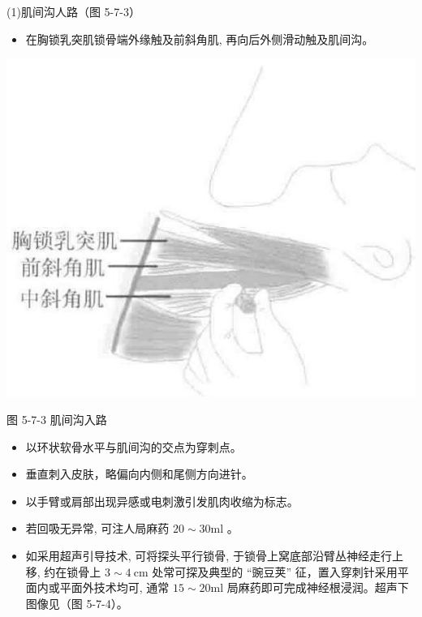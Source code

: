 \documentclass[10pt]{article}
\begin{document}
(1)肌间沟人路（图 5-7-3）

\begin{itemize}
  \item 在胸锁乳突肌锁骨端外缘触及前斜角肌, 再向后外侧滑动触及肌间沟。
\end{itemize}

\begin{center}
\includegraphics[max width=\textwidth]{2024_07_05_645bb794a4d4f32ee0c8g-318}
\end{center}

图 5-7-3 肌间沟入路

\begin{itemize}
  \item 以环状软骨水平与肌间沟的交点为穿刺点。

  \item 垂直刺入皮肤，略偏向内侧和尾侧方向进针。

  \item 以手臂或肩部出现异感或电刺激引发肌肉收缩为标志。

  \item 若回吸无异常, 可注人局麻药 $20 \sim 30 \mathrm{ml}$ 。

  \item 如采用超声引导技术, 可将探头平行锁骨, 于锁骨上窝底部沿臂丛神经走行上移, 约在锁骨上 $3 \sim 4 \mathrm{~cm}$ 处常可探及典型的 “豌豆荚” 征，置入穿刺针采用平面内或平面外技术均可, 通常 $15 \sim 20 \mathrm{ml}$ 局麻药即可完成神经根浸润。超声下图像见（图 5-7-4）。

\end{itemize}
\end{document}

